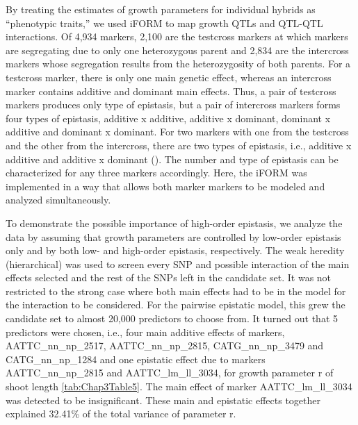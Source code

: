 \documentclass[11pt,]{book}
\theoremstyle{definition}
\theoremstyle{definition}
\theoremstyle{remark}
\begin{document}
By treating the estimates of growth parameters for individual hybrids as
``phenotypic traits,'' we used iFORM to map growth QTLs and QTL-QTL
interactions. Of 4,934 markers, 2,100 are the testcross markers at which
markers are segregating due to only one heterozygous parent and 2,834
are the intercross markers whose segregation results from the
heterozygosity of both parents. For a testcross marker, there is only
one main genetic effect, whereas an intercross marker contains additive
and dominant main effects. Thus, a pair of testcross markers produces
only type of epistasis, but a pair of intercross markers forms four
types of epistasis, additive x additive, additive x dominant, dominant x
additive and dominant x dominant. For two markers with one from the
testcross and the other from the intercross, there are two types of
epistasis, i.e., additive x additive and additive x dominant
(\cite{tong20113funmap}). The number and type of epistasis can be
characterized for any three markers accordingly. Here, the iFORM was
implemented in a way that allows both marker markers to be modeled and
analyzed simultaneously.

To demonstrate the possible importance of high-order epistasis, we
analyze the data by assuming that growth parameters are controlled by
low-order epistasis only and by both low- and high-order epistasis,
respectively. The weak heredity (hierarchical) was used to screen every
SNP and possible interaction of the main effects selected and the rest
of the SNPs left in the candidate set. It was not restricted to the
strong case where both main effects had to be in the model for the
interaction to be considered. For the pairwise epistatic model, this
grew the candidate set to almost 20,000 predictors to choose from. It
turned out that 5 predictors were chosen, i.e., four main additive
effects of markers, AATTC\_nn\_np\_2517, AATTC\_nn\_np\_2815,
CATG\_nn\_np\_3479 and CATG\_nn\_np\_1284 and one epistatic effect due
to markers AATTC\_nn\_np\_2815 and AATTC\_lm\_ll\_3034, for growth
parameter r of shoot length \ref{tab:Chap3Table5}. The main effect of
marker AATTC\_lm\_ll\_3034 was detected to be insignificant. These main
and epistatic effects together explained 32.41\% of the total variance
of parameter r.
\end{document}
